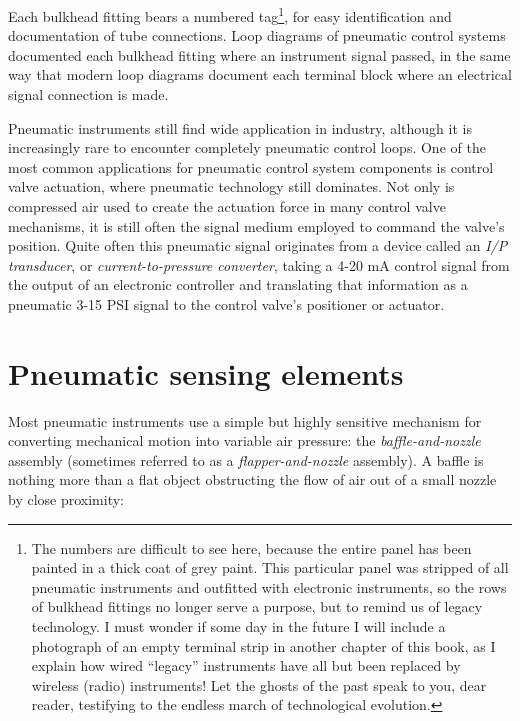 Each bulkhead fitting bears a numbered tag\footnote{The numbers are difficult to see here, because the entire panel has been painted in a thick coat of grey paint.  This particular panel was stripped of all pneumatic instruments and outfitted with electronic instruments, so the rows of bulkhead fittings no longer serve a purpose, but to remind us of legacy technology.  I must wonder if some day in the future I will include a photograph of an empty terminal strip in another chapter of this book, as I explain how wired ``legacy'' instruments have all but been replaced by wireless (radio) instruments!  Let the ghosts of the past speak to you, dear reader, testifying to the endless march of technological evolution.}, for easy identification and documentation of tube connections.  Loop diagrams of pneumatic control systems documented each bulkhead fitting where an instrument signal passed, in the same way that modern loop diagrams document each terminal block where an electrical signal connection is made.

\vskip 10pt

Pneumatic instruments still find wide application in industry, although it is increasingly rare to encounter completely pneumatic control loops.  One of the most common applications for pneumatic control system components is control valve actuation, where pneumatic technology still dominates.  Not only is compressed air used to create the actuation force in many control valve mechanisms, it is still often the signal medium employed to command the valve's position.  Quite often this pneumatic signal originates from a device called an \textit{I/P transducer}, or \textit{current-to-pressure converter}, taking a 4-20 mA control signal from the output of an electronic controller and translating that information as a pneumatic 3-15 PSI signal to the control valve's positioner or actuator.  











\filbreak
\section{Pneumatic sensing elements} 

Most pneumatic instruments use a simple but highly sensitive mechanism for converting mechanical motion into variable air pressure: the \textit{baffle-and-nozzle} assembly (sometimes referred to as a \textit{flapper-and-nozzle} assembly).  A baffle is nothing more than a flat object obstructing the flow of air out of a small nozzle by close proximity:    

